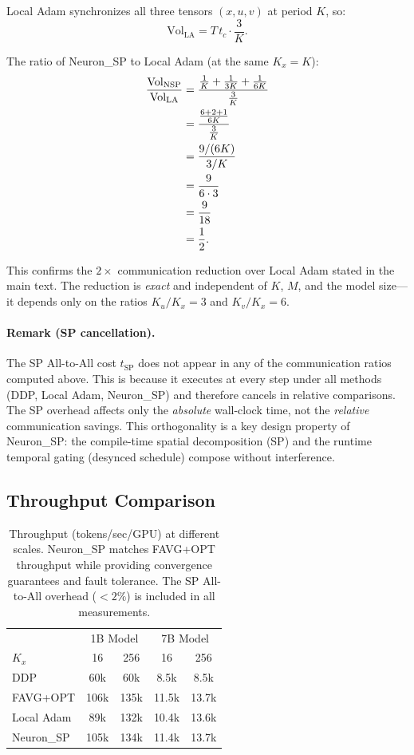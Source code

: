 \documentclass{article}
\begin{document}
Local Adam synchronizes all three tensors $(x, u, v)$ at period $K$, so:
\begin{equation}
\text{Vol}_{\text{LA}} = T\,t_c \cdot \frac{3}{K}.
\label{eq:vol_la}
\end{equation}

The ratio of Neuron\_SP to Local Adam (at the same $K_x = K$):
\begin{align}
\frac{\text{Vol}_{\text{NSP}}}{\text{Vol}_{\text{LA}}}
&= \frac{\frac{1}{K} + \frac{1}{3K} + \frac{1}{6K}}
{\frac{3}{K}}
\notag \\
&= \frac{\frac{6 + 2 + 1}{6K}}{\frac{3}{K}}
\notag \\
&= \frac{9/(6K)}{3/K}
\notag \\
&= \frac{9}{6 \cdot 3}
\notag \\
&= \frac{9}{18}
\notag \\
&= \frac{1}{2}.
\label{eq:nsp_vs_la}
\end{align}

This confirms the $2\times$ communication reduction over Local Adam
stated in the main text. The reduction is \emph{exact} and independent of
$K$, $M$, and the model size---it depends only on the ratios
$K_u/K_x = 3$ and $K_v/K_x = 6$.

\paragraph{Remark (SP cancellation).}
The SP All-to-All cost $t_{\text{SP}}$ does not appear in any of the
communication ratios computed above. This is because it executes at every
step under all methods (DDP, Local Adam, Neuron\_SP) and therefore cancels
in relative comparisons. The SP overhead affects only the \emph{absolute}
wall-clock time, not the \emph{relative} communication savings. This
orthogonality is a key design property of Neuron\_SP: the compile-time
spatial decomposition (SP) and the runtime temporal gating (desynced
schedule) compose without interference.

\subsection{Throughput Comparison}

\begin{table}[h]
\centering
\caption{Throughput (tokens/sec/GPU) at different scales. Neuron\_SP
matches FAVG+OPT throughput while providing convergence guarantees and
fault tolerance. The SP All-to-All overhead ($<2\%$) is included in all
measurements.}
\label{tab:throughput}
\begin{tabular}{l|cc|cc}
\toprule
& \multicolumn{2}{c|}{1B Model} & \multicolumn{2}{c}{7B Model} \\
$K_x$ & 16 & 256 & 16 & 256 \\
\midrule
DDP          & 60k & 60k & 8.5k & 8.5k \\
FAVG+OPT     & 106k & 135k & 11.5k & 13.7k \\
Local Adam   & 89k & 132k & 10.4k & 13.6k \\
Neuron\_SP   & 105k & 134k & 11.4k & 13.7k \\
\bottomrule
\end{tabular}
\end{table}
\end{document}
